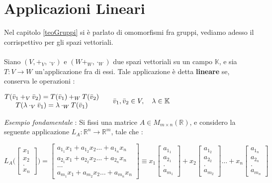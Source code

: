 \documentclass[12pt, letterpaper]{article}
\newcommand{\R}{{\mathbb R}}
\newcommand{\ve}{{\bar v}}
\newcommand{\acc}{\\\hphantom{}\\}
\begin{document}
\section{Applicazioni Lineari}\label{appLin}
Nel capitolo \ref{teoGruppi} si è parlato di omomorfismi fra gruppi, vediamo adesso il corrispettivo 
per gli spazi vettoriali.\acc 
Siano \((V,+_V,\cdot_V)\) e  \((W+_W,\cdot_W)\) due spazi vettoriali su un campo \(\mathbb{K}\), e sia \(T:V\rightarrow W\) un'applicazione fra di essi.
Tale applicazione è detta \textbf{lineare} se, conserva le operazioni : \begin{center}
    \(\begin{matrix}T(\ve_1+_V\ve_2)=T(\ve_1)+_W T(\ve_2)\\
        T(\lambda \cdot_V \ve_1)=\lambda \cdot_W T(\ve_1)
    \end{matrix}\text{\hphantom{aaaa}} \ve_1,\ve_2\in V,\text{\hphantom{aa}} \lambda \in \mathbb{K}\)
\end{center}
\textit{Esempio fondamentale} : Si fissi una matrice \(A\in M_{m\times n}(\R)\), e considero la seguente 
applicazione \(L_A : \R^n\rightarrow \R^m\), tale che : \begin{center}
    \(
    L_A\Bigg(\begin{bmatrix}
        x_1\\x_2\\.\\x_n
    \end{bmatrix}\Bigg)  =\begin{bmatrix}
        a_{1_1}x_1+a_{1_2}x_2\dots+a_{1_n}x_n\\
        a_{2_1}x_1+a_{2_2}x_2\dots+a_{2_n}x_n\\\dots \\
        a_{m_1}x_1+a_{m_2}x_2\dots+a_{m_n}x_n
    \end{bmatrix} \equiv x_1 \begin{bmatrix}
        a_{1_1}\\ a_{2_1}\\.\\a_{m_1}
    \end{bmatrix} +x_2 \begin{bmatrix}
        a_{1_2}\\ a_{2_2}\\.\\a_{m_2}
    \end{bmatrix} \dots +x_n \begin{bmatrix}
        a_{1_n}\\ a_{2_n}\\.\\a_{m_n}
    \end{bmatrix} 
    \)
\end{center}
\end{document}
